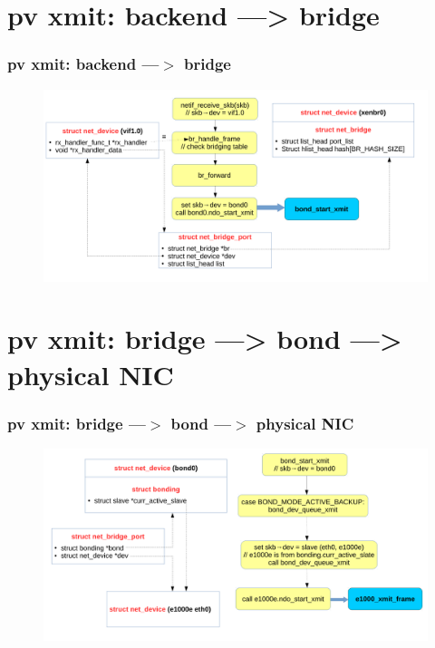 \documentclass[aspectratio=169]{beamer}
\begin{document}

\section{pv xmit: backend ---> bridge}
\begin{frame}
\frametitle{pv xmit: backend ---$>$ bridge}
\begin{figure}
\includegraphics[width=1.0\linewidth]{figures/vif_to_bridge.pdf}
\end{figure}
\end{frame}


\section{pv xmit: bridge ---> bond ---> physical NIC}
\begin{frame}
\frametitle{pv xmit: bridge ---$>$ bond ---$>$ physical NIC}
\begin{figure}
\includegraphics[width=1.0\linewidth]{figures/bridge_to_bond.pdf}
\end{figure}
\end{frame}
\end{document}
